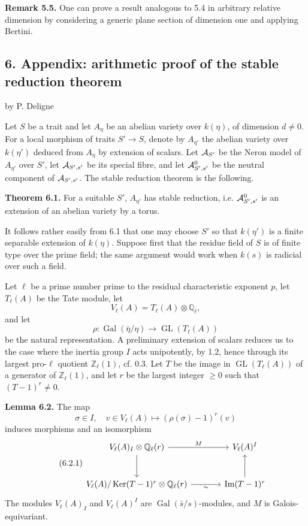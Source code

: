 \documentclass[11pt]{article}
\providecommand{\Gal}{\operatorname{Gal}}
\providecommand{\GL}{\operatorname{GL}}
\providecommand{\Ker}{\operatorname{Ker}}
\providecommand{\Ql}{\mathbb Q_\ell}
\providecommand{\Zl}{\mathbb Z_\ell}
\begin{document}
\textbf{Remark 5.5.} One can prove a result analogous to 5.4 in arbitrary relative dimension by considering a generic plane section of dimension one and applying Bertini.

\subsection*{6. Appendix: arithmetic proof of the stable reduction theorem}
\begin{center}
by P. Deligne
\end{center}
Let $S$ be a trait and let $A_\eta$ be an abelian variety over $k(\eta)$, of dimension $d\ne0$. For a local morphism of traits $S'\to S$, denote by $A_{\eta'}$ the abelian variety over $k(\eta')$ deduced from $A_\eta$ by extension of scalars. Let $\mathcal A_{S'}$ be the Neron model of $A_{\eta'}$ over $S'$, let $\mathcal A_{S',s'}$ be its special fibre, and let $\mathcal A^0_{S',s'}$ be the neutral component of $\mathcal A_{S',s'}$. The stable reduction theorem is the following.

\textbf{Theorem 6.1.} For a suitable $S'$, $A_{\eta'}$ has stable reduction, i.e. $\mathcal A^0_{S',s'}$ is an extension of an abelian variety by a torus.

It follows rather easily from 6.1 that one may choose $S'$ so that $k(\eta')$ is a finite separable extension of $k(\eta)$. Suppose first that the residue field of $S$ is of finite type over the prime field; the same argument would work when $k(s)$ is radicial over such a field.

Let $\ell$ be a prime number prime to the residual characteristic exponent $p$, let $T_\ell(A)$ be the Tate module, let
\[
 V_\ell(A)=T_\ell(A)\otimes\Ql,
\]
and let
\[
 \rho:\Gal(\bar\eta/\eta)\longrightarrow \GL(T_\ell(A))
\]
be the natural representation. A preliminary extension of scalars reduces us to the case where the inertia group $I$ acts unipotently, by 1.2, hence through its largest pro-$\ell$ quotient $\Zl(1)$, cf. 0.3. Let $T$ be the image in $\GL(T_\ell(A))$ of a generator of $\Zl(1)$, and let $r$ be the largest integer $\ge0$ such that $(T-1)^r\ne0$.

\textbf{Lemma 6.2.} The map
\[
 \sigma\in I,
 \quad v\in V_\ell(A)
 \longmapsto (\rho(\sigma)-1)^r(v)
\]
induces morphisms and an isomorphism
\begin{equation}\qquad\text{(6.2.1)}
\begin{tikzcd}[column sep=large,row sep=large]
 V_\ell(A)_I\otimes\Ql(r) \arrow[r,"M"] \arrow[d]
 & V_\ell(A)^I \\
 V_\ell(A)/\Ker(T-1)^r\otimes\Ql(r) \arrow[r,"\sim"']
 & \Ima(T-1)^r \arrow[u]
\end{tikzcd}
\end{equation}
The modules $V_\ell(A)_I$ and $V_\ell(A)^I$ are $\Gal(\bar s/s)$-modules, and $M$ is Galois-equivariant.
\end{document}
